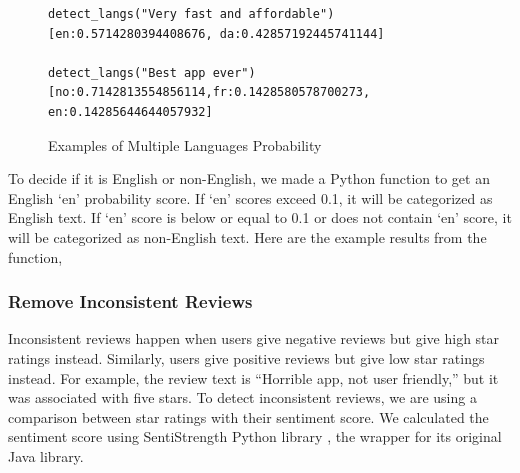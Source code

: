 \documentclass[12pt]{article}
\begin{document}
\begin{figure}[!h]
\begin{lstlisting}
detect_langs("Very fast and affordable")
[en:0.5714280394408676, da:0.42857192445741144]

detect_langs("Best app ever")
[no:0.7142813554856114,fr:0.1428580578700273, en:0.14285644644057932]

\end{lstlisting}
\caption{Examples of Multiple Languages Probability}
\label{fig:langdetect_2}
\end{figure}






To decide if it is English or non-English, we made a Python function to get an English ‘en’ probability score. If ‘en’ scores exceed 0.1, it will be categorized as English text. If ‘en’ score is below or equal to 0.1 or does not contain ‘en’ score, it will be categorized as non-English text. Here are the example results from the function,



\subsubsection{Remove Inconsistent Reviews}
Inconsistent reviews happen when users give negative reviews but give high star ratings instead. Similarly, users give positive reviews but give low star ratings instead. For example, the review text is “Horrible app, not user friendly,” but it was associated with five stars. To detect inconsistent reviews, we are using a comparison between star ratings with their sentiment score. We calculated the sentiment score using SentiStrength Python library \cite{sentistrength}, the wrapper for its original Java library.
\end{document}
